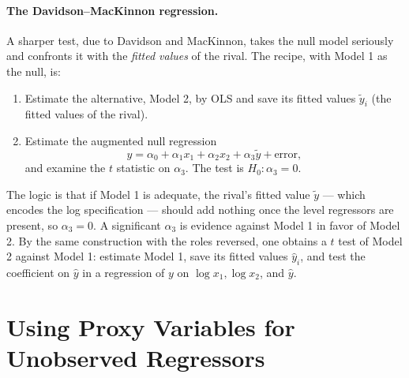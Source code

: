 \paragraph{The Davidson--MacKinnon regression.}
A sharper test, due to Davidson and MacKinnon, takes the null model seriously and confronts it with the \emph{fitted values} of the rival. The recipe, with Model 1 as the null, is:
\begin{enumerate}
    \item Estimate the alternative, Model 2, by OLS and save its fitted values $\tilde y_i$ (the fitted values of the rival).
    \item Estimate the augmented null regression
    \[
    y = \alpha_0 + \alpha_1 x_1 + \alpha_2 x_2 + \alpha_3 \tilde y + \text{error},
    \]
    and examine the $t$ statistic on $\alpha_3$. The test is $H_0:\alpha_3 = 0$.
\end{enumerate}
The logic is that if Model 1 is adequate, the rival's fitted value $\tilde y$ --- which encodes the log specification --- should add nothing once the level regressors are present, so $\alpha_3=0$. A significant $\alpha_3$ is evidence against Model 1 in favor of Model 2. By the same construction with the roles reversed, one obtains a $t$ test of Model 2 against Model 1: estimate Model 1, save its fitted values $\hat y_i$, and test the coefficient on $\hat y$ in a regression of $y$ on $\log x_1, \log x_2$, and $\hat y$.


\section{Using Proxy Variables for Unobserved Regressors}

